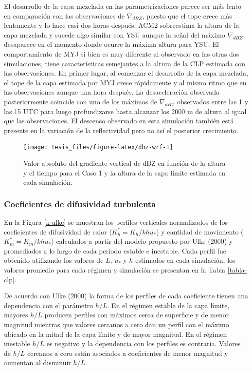 \documentclass[12pt,spanish,oneside, a4paper]{book}
\begin{document}
El desarrollo de la capa mezclada en las parametrizaciones parece ser
más lento en comparación con las observaciones de \(\nabla_{dBZ}\),
puesto que el tope crece más lentamente y lo hace casi dos horas
después. ACM2 sobreestima la altura de la capa mezclada y sucede algo
similar con YSU aunque la señal del máximo \(\nabla_{dBZ}\) desaparece
en el momento donde ocurre la máxima altura para YSU. El comportamiento
de MYJ si bien es muy diferente al observado en las otras dos
simulaciones, tiene características semejantes a la altura de la CLP
estimada con las observaciones. En primer lugar, al comenzar el
desarrollo de la capa mezclada, el tope de la capa estimada por MYJ
crece rápidamente y al mismo ritmo que en las observaciones aunque una
hora después. La desaceleración observada posteriormente coincide con
uno de los máximos de \(\nabla_{dBZ}\) observados entre las 1 y las 15
UTC para luego profundizarse hasta alcanzar los 2000 m de altura al
igual que las observaciones. El descenso observado en esta simulación
también está presente en la variación de la reflectividad pero no así el
posterior crecimiento.

\begin{figure}

{\centering \texttt{[image: Tesis\_files/figure-latex/dbz-wrf-1]} 

}

\caption{Valor absoluto del gradiente vertical de dBZ en función de la altura y el tiempo para el Caso 1 y la altura de la capa límite estimada en cada simulación. \label{pblh-dbz}}\label{fig:dbz-wrf}
\end{figure}

\subsubsection{Coeficientes de difusividad
turbulenta}\label{coeficientes-de-difusividad-turbulenta-1}

En la Figura \ref{k-ulke} se muestran los perfiles verticales
normalizados de los coeficientes de difusividad de calor
(\(K_h^* = K_h/khu_*\)) y cantidad de movimiento (\(K_m^* = K_m/khu_*\))
calculados a partir del modelo propuesto por Ulke (2000) y promediados a
lo largo de cada período estable e inestable. Cada perfil fue obtenido
utilizando los valores de \(L\), \(u_*\) y \(h\) estimados en cada
simulación, los valores promedio para cada régimen y simulación se
presentan en la Tabla \ref{tabla-clp}.

De acuerdo con Ulke (2000) la forma de los perfiles de cada coeficiente
tienen una dependencia con el parámetro \(h/L\). En el régimen estable
de la capa límite, mayores \(h/L\) producen perfiles con máximos cerca
de superficie y de menor magnitud mientras que valores cercanos a cero
dan un perfil con el máximo ubicado en la mitad de la capa límite y de
mayor magnitud. En el régimen inestable \(h/L\) es negativo y la
dependencia con los perfiles es contraria. Valores de \(h/L\) cercanos a
cero están asociados a coeficientes de menor magnitud y aumentan al
disminuir \(h/L\).
\end{document}
